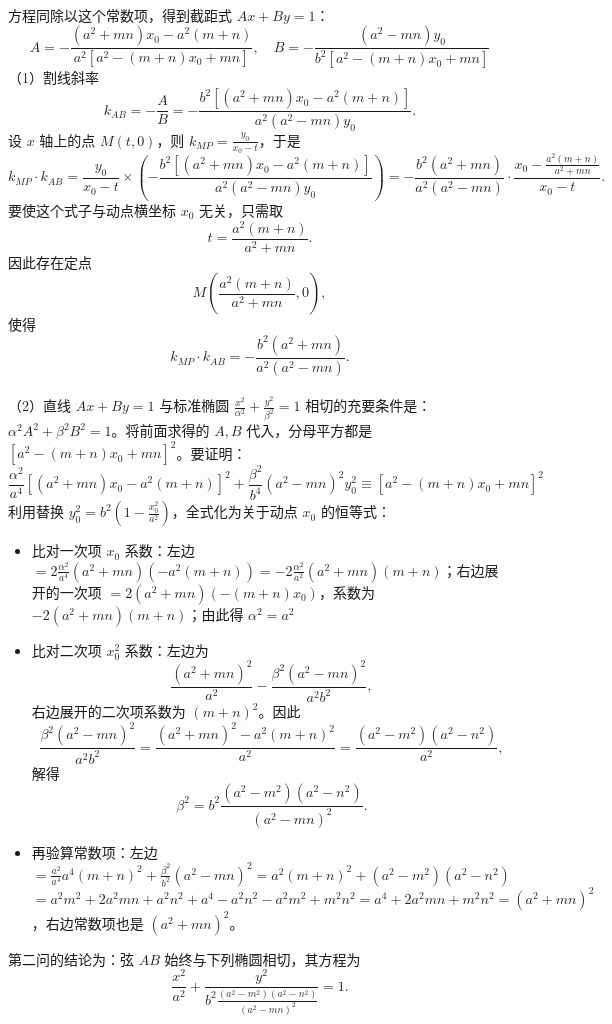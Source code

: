 \begin{solution}
\begin{align*}
\end{align*}
方程同除以这个常数项，得到截距式 $Ax + By = 1$：
$$A = -\frac{(a^2+mn)x_0 - a^2(m+n)}{a^2[a^2 - (m+n)x_0 + mn]}, \quad B = -\frac{(a^2-mn)y_0}{b^2[a^2 - (m+n)x_0 + mn]}$$
（1）割线斜率
$$k_{AB} = -\frac{A}{B} = - \frac{b^2[(a^2+mn)x_0 - a^2(m+n)]}{a^2(a^2-mn)y_0}.$$
设 $x$ 轴上的点 $M(t,0)$，则 $k_{MP} = \frac{y_0}{x_0-t}$，于是
$$k_{MP} \cdot k_{AB} = \frac{y_0}{x_0-t} \times \left( - \frac{b^2[(a^2+mn)x_0 - a^2(m+n)]}{a^2(a^2-mn)y_0} \right) = - \frac{b^2(a^2+mn)}{a^2(a^2-mn)} \cdot \frac{x_0 - \frac{a^2(m+n)}{a^2+mn}}{x_0-t}.$$
要使这个式子与动点横坐标 $x_0$ 无关，只需取
$$t = \frac{a^2(m+n)}{a^2+mn}.$$
因此存在定点
$$M \left( \frac{a^2(m+n)}{a^2+mn}, 0 \right),$$
使得
$$k_{MP} \cdot k_{AB} = -\frac{b^2(a^2+mn)}{a^2(a^2-mn)}.$$
\\
（2）直线 $Ax + By = 1$ 与标准椭圆 $\frac{x^2}{\alpha^2} + \frac{y^2}{\beta^2} = 1$ 相切的充要条件是：$\alpha^2 A^2 + \beta^2 B^2 = 1$。将前面求得的 $A, B$ 代入，分母平方都是 $[a^2 - (m+n)x_0 + mn]^2$。要证明：
$$\frac{\alpha^2}{a^4} [ (a^2+mn)x_0 - a^2(m+n) ]^2 + \frac{\beta^2}{b^4} (a^2-mn)^2 y_0^2 \equiv [a^2 - (m+n)x_0 + mn]^2$$
利用替换 $y_0^2 = b^2(1 - \frac{x_0^2}{a^2})$，全式化为关于动点 $x_0$ 的恒等式：
\begin{itemize}
\item 比对一次项 $x_0$ 系数：左边 $= 2 \frac{\alpha^2}{a^4} (a^2+mn)(-a^2(m+n)) = -2 \frac{\alpha^2}{a^2} (a^2+mn)(m+n)$；右边展开的一次项 $= 2(a^2+mn)(-(m+n)x_0)$，系数为 $-2(a^2+mn)(m+n)$；由此得 $\alpha^2 = a^2$
\item 比对二次项 $x_0^2$ 系数：左边为
$$\frac{(a^2+mn)^2}{a^2} - \frac{\beta^2(a^2-mn)^2}{a^2 b^2},$$
右边展开的二次项系数为 $(m+n)^2$。因此
$$\frac{\beta^2(a^2-mn)^2}{a^2 b^2} = \frac{(a^2+mn)^2 - a^2(m+n)^2}{a^2} =  \frac{(a^2-m^2)(a^2-n^2)}{a^2},$$
解得
$$\beta^2 = b^2 \frac{(a^2-m^2)(a^2-n^2)}{(a^2-mn)^2}.$$
\item 再验算常数项：左边 $= \frac{a^2}{a^4} a^4(m+n)^2 + \frac{\beta^2}{b^2}(a^2-mn)^2 = a^2(m+n)^2 + (a^2-m^2)(a^2-n^2)$$= a^2 m^2 + 2a^2 mn + a^2 n^2 + a^4 - a^2 n^2 - a^2 m^2 + m^2 n^2 = a^4 + 2a^2 mn + m^2 n^2 = (a^2+mn)^2$，右边常数项也是 $(a^2+mn)^2$。
\end{itemize}
第二问的结论为：弦 $AB$ 始终与下列椭圆相切，其方程为
$$\frac{x^2}{a^2} + \frac{y^2}{b^2 \frac{(a^2-m^2)(a^2-n^2)}{(a^2-mn)^2}} = 1.$$
\end{solution}


